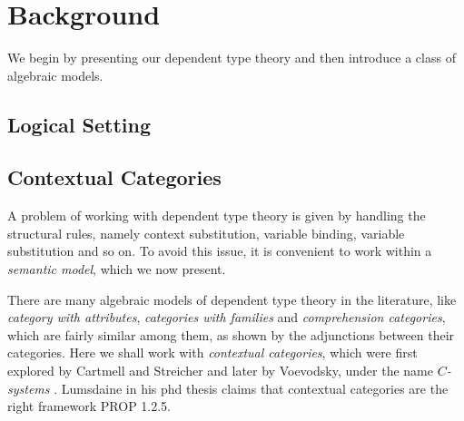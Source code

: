 \chapter{Background}

We begin by presenting our dependent type theory and then introduce a class of
algebraic models.


\section{Logical Setting}

\section{Contextual Categories}

A problem of working with dependent type theory is
given by handling the structural rules, namely context substitution, variable
binding, variable substitution and so on. To avoid this issue, it is convenient
to work within a \emph{semantic model}, which we now present.

There are many algebraic models of dependent type theory in the literature, like
\emph{category with attributes}, \emph{categories with families} and
\emph{comprehension categories}, which are
fairly similar among them, as shown by the adjunctions between their categories.
Here we shall work with \emph{contextual
categories}, which were first explored by Cartmell and Streicher
\cite{Car78,Car86,Str91} and later by Voevodsky, under the name
$C$\emph{-systems} \cite{Voe14a,Voe14b,Voe15a,Voe15b}. Lumsdaine in his phd
thesis claims that contextual
categories are the right framework PROP 1.2.5.

